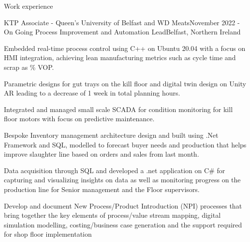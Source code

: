 \documentclass{resume} %
\begin{document}


\begin{rSection}{Work experience}

    \begin{rSubsection}{KTP Associate - Queen's University of Belfast and WD Meats}{November 2022 - On Going }{Process Improvement and Automation Lead}{Belfast, Northern Ireland}
       \item  Embedded real-time process control using C++ on Ubuntu 20.04 with a focus on HMI integration, achieving lean manufacturing metrics such as cycle time and scrap as \% VOP.
        \item Parametric designs for gut trays on the kill floor and digital twin design on Unity AR leading to a decrease of 1 week in total planning hours.
        \item Integrated and managed small scale SCADA for condition monitoring for kill floor motors with focus on predictive maintenance.
        \item Bespoke Inventory management architecture design and built using .Net Framework and SQL, modelled to forecast buyer needs and production that helps improve slaughter line based on orders and sales from last month. 
        \item Data acquisition through SQL and developed a .net application on C\# for capturing and visualizing insights on  data as well as monitoring progress on the production line for Senior management and the Floor supervisors.
        \item Develop and document New Process/Product Introduction (NPI) processes that bring together the key elements of process/value stream mapping, digital simulation modelling, costing/business case generation and the support required for shop floor implementation
        
        
    \end{rSubsection}


\end{rSection}
\end{document}
